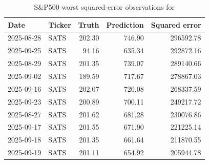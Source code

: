 
\begin{table}[H]
\centering
\caption{S\&P500 worst squared-error observations for }
\label{tab:wst-gnnhar2l-q-iv}
\scriptsize
\begin{tabular}{llrrr}
\toprule
Date & Ticker & Truth & Prediction & Squared error \\
\midrule
2025-08-28 & SATS & 202.30 & 746.90 & 296592.78 \\
2025-09-25 & SATS & 94.16 & 635.34 & 292872.16 \\
2025-08-29 & SATS & 201.35 & 739.07 & 289140.66 \\
2025-09-02 & SATS & 189.59 & 717.67 & 278867.03 \\
2025-09-16 & SATS & 202.07 & 720.08 & 268337.59 \\
2025-09-23 & SATS & 200.89 & 700.11 & 249217.72 \\
2025-08-27 & SATS & 201.62 & 681.28 & 230076.86 \\
2025-09-17 & SATS & 201.55 & 671.90 & 221225.14 \\
2025-09-18 & SATS & 201.35 & 661.64 & 211870.55 \\
2025-09-19 & SATS & 201.11 & 654.92 & 205944.78 \\

\bottomrule
\end{tabular}
\end{table}
